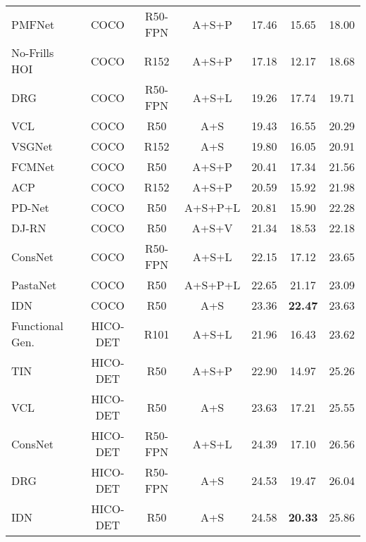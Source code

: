 \documentclass[final]{cvpr}
\begin{document}
\begin{table*}[h!]
\begin{tabular}{l c c c c c c}
    \multicolumn{1}{l|}{PMFNet~\cite{wan2019pose}} & COCO & R50-FPN & \multicolumn{1}{c|}{A+S+P} & 17.46 & 15.65 & 18.00  \\
    \multicolumn{1}{l|}{No-Frills HOI~\cite{gupta2019no}} & COCO & R152 & \multicolumn{1}{c|}{A+S+P} & 17.18 & 12.17 & 18.68  \\
\multicolumn{1}{l|}{DRG~\cite{gao2020drg}} & COCO & R50-FPN & \multicolumn{1}{c|}{A+S+L} & 19.26 & 17.74 & 19.71  \\
    \multicolumn{1}{l|}{VCL~\cite{hou2020visual}} & COCO & R50 & \multicolumn{1}{c|}{A+S} & 19.43 & 16.55 & 20.29  \\
    \multicolumn{1}{l|}{VSGNet~\cite{ulutan2020vsgnet}} & COCO & R152 & \multicolumn{1}{c|}{A+S} & 19.80 & 16.05 & 20.91  \\
    \multicolumn{1}{l|}{FCMNet~\cite{liu2020amplifying}} & COCO & R50 & \multicolumn{1}{c|}{A+S+P} & 20.41	& 17.34	& 21.56  \\
    \multicolumn{1}{l|}{ACP~\cite{kim2020detecting}} & COCO & R152 & \multicolumn{1}{c|}{A+S+P} & 20.59 & 15.92 & 21.98  \\
    \multicolumn{1}{l|}{PD-Net~\cite{zhong2020polysemy}} & COCO & R50 & \multicolumn{1}{c|}{A+S+P+L} & 20.81 & 15.90 & 22.28  \\
    \multicolumn{1}{l|}{DJ-RN~\cite{li2020detailed}} & COCO & R50 & \multicolumn{1}{c|}{A+S+V} & 21.34 & 18.53 & 22.18  \\
    \multicolumn{1}{l|}{ConsNet~\cite{liu2020consnet}} & COCO & R50-FPN & \multicolumn{1}{c|}{A+S+L} & 22.15 & 17.12 & 23.65  \\
    \multicolumn{1}{l|}{PastaNet~\cite{li2020pastanet}} & COCO & R50 & \multicolumn{1}{c|}{A+S+P+L} & 22.65 & 21.17 & 23.09  \\
    \multicolumn{1}{l|}{IDN~\cite{li2020hoi}} & COCO & R50 & \multicolumn{1}{c|}{A+S} & 23.36 & \textbf{22.47} & 23.63  \\ \hline
    
    \multicolumn{1}{l|}{Functional Gen.~\cite{bansal2020detecting}} & HICO-DET & R101 & \multicolumn{1}{c|}{A+S+L} & 21.96 & 16.43 & 23.62  \\
    \multicolumn{1}{l|}{TIN~\cite{li2019transferable}} & HICO-DET & R50 & \multicolumn{1}{c|}{A+S+P} & 22.90 & 14.97 & 25.26  \\
    \multicolumn{1}{l|}{VCL~\cite{hou2020visual}} & HICO-DET & R50 & \multicolumn{1}{c|}{A+S} & 23.63 & 17.21 & 25.55  \\
    \multicolumn{1}{l|}{ConsNet~\cite{liu2020consnet}} & HICO-DET & R50-FPN & \multicolumn{1}{c|}{A+S+L} & 24.39 & 17.10 & 26.56  \\
    \multicolumn{1}{l|}{DRG~\cite{gao2020drg}} & HICO-DET & R50-FPN & \multicolumn{1}{c|}{A+S} & 24.53 & 19.47 & 26.04  \\
    \multicolumn{1}{l|}{IDN~\cite{li2020hoi}} & HICO-DET & R50 & \multicolumn{1}{c|}{A+S} & 24.58 & \textbf{20.33} & 25.86  \\ \midrule\hline
    

\end{tabular}
\end{table*}
\end{document}
